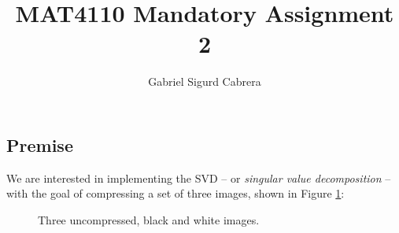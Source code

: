 \documentclass[a4paper,10pt,english]{article}
\begin{document}
\newcommand\esymbol[1]{\begin{circuitikz}
\draw (0,0) to [#1] (1,0); \end{circuitikz}}

\title{MAT4110 Mandatory Assignment 2}
\author{Gabriel Sigurd Cabrera}

\maketitle

\begin{multicols*}{2}

\section*{Premise}

We are interested in implementing the SVD – or \textit{singular value decomposition} – with the goal of compressing a set of three images, shown in Figure \ref{fig_0}:

\begin{figure}[H]
 \centering
   	\qquad
    \caption{Three uncompressed, black and white images.\label{fig_0}}
\end{figure}


\end{multicols*}
\end{document}
